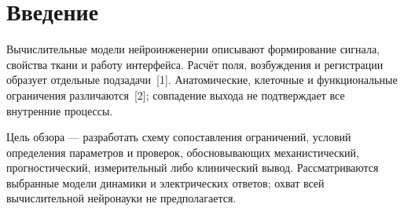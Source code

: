\documentclass[12pt,a4paper]{article}
\begin{document}
\section*{Введение}
Вычислительные модели нейроинженерии описывают формирование сигнала, свойства ткани и работу интерфейса. Расчёт поля, возбуждения и регистрации образует отдельные подзадачи~\mbox{[1]}. Анатомические, клеточные и функциональные ограничения различаются~\mbox{[2]}; совпадение выхода не подтверждает все внутренние процессы.\par
Цель обзора — разработать схему сопоставления ограничений, условий определения параметров и проверок, обосновывающих механистический, прогностический, измерительный либо клинический вывод. Рассматриваются выбранные модели динамики и электрических ответов; охват всей вычислительной нейронауки не предполагается.\par
\end{document}
